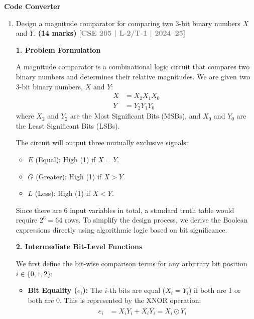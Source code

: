 \documentclass[12pt,a3paper]{article}
\newcommand{\yr}[1]{\hfill\textcolor{gray}{\small\textbf{[#1]}}}
\newcommand{\mk}[1]{\textcolor{orange!70!black}{\small\textbf{(#1 marks)}}}
\newcommand{\subtopic}[2]{%
  \vspace{10pt}
  \noindent\begin{tcolorbox}[colback=#1!8,colframe=#1,boxrule=0.6pt,arc=4pt,
    left=6pt,right=6pt,top=4pt,bottom=4pt]
    \small\bfseries\textcolor{#1}{#2}
  \end{tcolorbox}
  \vspace{2pt}
}
\begin{document}
\subtopic{cD}{Code Converter}
\label{sub:s4-code-converter}

\begin{enumerate}

\item Design a magnitude comparator for comparing two 3-bit binary numbers $X$ and $Y$.
\mk{14} \yr{CSE 205 | L-2/T-1 | 2024--25}

\begin{tcolorbox}[enhanced,breakable,ansbox,colback=cD!4,colframe=cD,boxrule=0.8pt,arc=5pt,title={\textbf{Answer}},fonttitle=\bfseries\color{white},colbacktitle=cD]

\textbf{1. Problem Formulation}

A magnitude comparator is a combinational logic circuit that compares two binary numbers and determines their relative magnitudes. We are given two 3-bit binary numbers, $X$ and $Y$:
\begin{align*}
    X &= X_2 X_1 X_0 \\
    Y &= Y_2 Y_1 Y_0
\end{align*}
where $X_2$ and $Y_2$ are the Most Significant Bits (MSBs), and $X_0$ and $Y_0$ are the Least Significant Bits (LSBs). 

The circuit will output three mutually exclusive signals:
\begin{itemize}
    \item $E$ (Equal): High (1) if $X = Y$.
    \item $G$ (Greater): High (1) if $X > Y$.
    \item $L$ (Less): High (1) if $X < Y$.
\end{itemize}

Since there are 6 input variables in total, a standard truth table would require $2^6 = 64$ rows. To simplify the design process, we derive the Boolean expressions directly using algorithmic logic based on bit significance.

\vspace{1em}
\textbf{2. Intermediate Bit-Level Functions}

We first define the bit-wise comparison terms for any arbitrary bit position $i \in \{0, 1, 2\}$:

\begin{itemize}
    \item \textbf{Bit Equality ($e_i$):} The $i$-th bits are equal ($X_i = Y_i$) if both are 1 or both are 0. This is represented by the XNOR operation:
    \begin{align*}
        e_i &= X_i Y_i + \overline{X_i}\overline{Y_i} = X_i \odot Y_i
    \end{align*}
    

\end{itemize}
\end{tcolorbox}
\end{enumerate}
\end{document}
